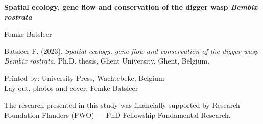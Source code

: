 \documentclass[10pt, twoside]{book} %
\begin{document}
%
\thispagestyle{mainmatter} %
	\frontmatter
	\pagestyle{frontmatter}
	\lstset{language=Perl}
	\begin{titlepage}
		
		\begin{center}	
			
			\thispagestyle{empty}
			
			\vspace*{3.00cm}
			
			{\huge \textbf{Spatial ecology, gene flow and conservation of the digger wasp \textit{Bembix rostrata}}}\\
			
			\vspace{7.0 cm}
			
		\end{center}
		

		
	\end{titlepage}

\newpage
		
	\color{black}
	\newpage 
	\thispagestyle{empty}

	\vspace*{\fill}

	\begin{small}

	\noindent {} Femke Batsleer

	\vspace{0.5cm}	

	\noindent Batsleer F. (2023). \textit{Spatial ecology, gene flow and conservation of the digger wasp \textit{Bembix rostrata}}. Ph.D. thesis, Ghent University, Ghent, Belgium.

	\vspace{0.5cm}	

\noindent Printed by: University Press, Wachtebeke, Belgium\\
Lay-out, photos and cover: Femke Batsleer \\


	\vspace*{0.5cm}
	
	\noindent The research presented in this study was financially supported by Research Foundation-Flanders (FWO) --- PhD Fellowship Fundamental Research.
	
	\vspace{1cm}
\end{small}	
\end{document}
